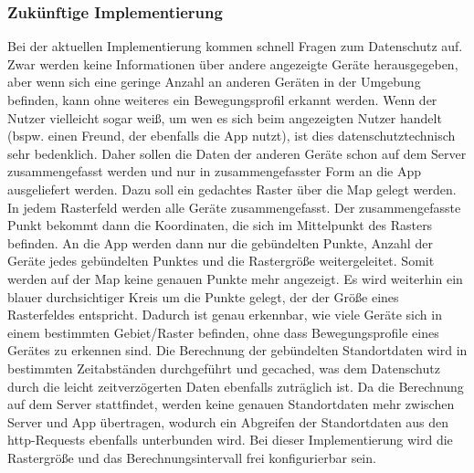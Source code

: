 \subsubsection{Zukünftige Implementierung}\label{subsubsec:mapFutureImpl}
Bei der aktuellen Implementierung kommen schnell Fragen zum Datenschutz auf. Zwar werden keine Informationen über andere angezeigte Geräte herausgegeben, aber wenn sich eine geringe Anzahl an anderen Geräten in der Umgebung befinden, kann ohne weiteres ein Bewegungsprofil erkannt werden. Wenn der Nutzer vielleicht sogar weiß, um wen es sich beim angezeigten Nutzer handelt (bspw. einen Freund, der ebenfalls die App nutzt), ist dies datenschutztechnisch sehr bedenklich. Daher sollen die Daten der anderen Geräte schon auf dem Server zusammengefasst werden und nur in zusammengefasster Form an die App ausgeliefert werden. Dazu soll ein gedachtes Raster über die Map gelegt werden. In jedem Rasterfeld werden alle Geräte zusammengefasst. Der zusammengefasste Punkt bekommt dann die Koordinaten, die sich im Mittelpunkt des Rasters befinden. An die App werden dann nur die gebündelten Punkte, Anzahl der Geräte jedes gebündelten Punktes und die Rastergröße weitergeleitet. Somit werden auf der Map keine genauen Punkte mehr angezeigt. Es wird weiterhin ein blauer durchsichtiger Kreis um die Punkte gelegt, der der Größe eines Rasterfeldes entspricht. Dadurch ist genau erkennbar, wie viele Geräte sich in einem bestimmten Gebiet/Raster befinden, ohne dass Bewegungsprofile eines Gerätes zu erkennen sind. Die Berechnung der gebündelten Standortdaten wird in bestimmten Zeitabständen durchgeführt und gecached, was dem Datenschutz durch die leicht zeitverzögerten Daten ebenfalls zuträglich ist. Da die Berechnung auf dem Server stattfindet, werden keine genauen Standortdaten mehr zwischen Server und App übertragen, wodurch ein Abgreifen der Standortdaten aus den http-Requests ebenfalls unterbunden wird. Bei dieser Implementierung wird die Rastergröße und das Berechnungsintervall frei konfigurierbar sein.
